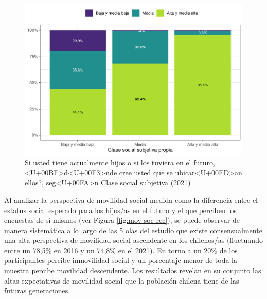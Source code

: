 \documentclass[
  12pt,
]{book}
\begin{document}
\begin{figure}

{\centering \includegraphics{reporte-elsoc_files/figure-latex/esshijos-ess-1} 

}

\caption{Si usted tiene actualmente hijos o si los tuviera en el futuro, <U+00BF>d<U+00F3>nde cree usted que se ubicar<U+00ED>an ellos?, seg<U+00FA>n Clase social subjetiva (2021)}\label{fig:esshijos-ess}
\end{figure}

Al analizar la perspectiva de movilidad social medida como la diferencia entre el estatus social esperado para los hijos/as en el futuro y el que perciben los encuestas de sí mismos (ver Figura \ref{fig:mov-soc-rec}), se puede observar de manera sistemática a lo largo de las 5 olas del estudio que existe consensualmente una alta perspectiva de movilidad social ascendente en los chilenos/as (fluctuando entre un 78,5\% en 2016 y un 74,8\% en el 2021). En torno a un 20\% de los participantes percibe inmovilidad social y un porcentaje menor de toda la muestra percibe movilidad descendente. Los resultados revelan en su conjunto las altas expectativas de movilidad social que la población chilena tiene de las futuras generaciones.
\end{document}
